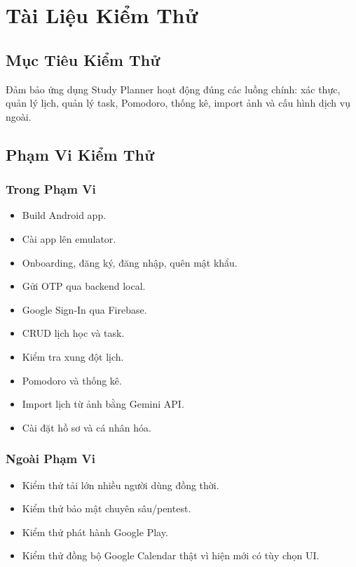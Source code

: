 \documentclass[12pt,a4paper]{report}
\begin{document}
\chapter{Tài Liệu Kiểm Thử}

\section{Mục Tiêu Kiểm Thử}

Đảm bảo ứng dụng Study Planner hoạt động đúng các luồng chính: xác thực, quản lý lịch, quản lý task, Pomodoro, thống kê, import ảnh và cấu hình dịch vụ ngoài.

\section{Phạm Vi Kiểm Thử}

\subsection{Trong Phạm Vi}

\begin{itemize}
\item Build Android app.
\item Cài app lên emulator.
\item Onboarding, đăng ký, đăng nhập, quên mật khẩu.
\item Gửi OTP qua backend local.
\item Google Sign-In qua Firebase.
\item CRUD lịch học và task.
\item Kiểm tra xung đột lịch.
\item Pomodoro và thống kê.
\item Import lịch từ ảnh bằng Gemini API.
\item Cài đặt hồ sơ và cá nhân hóa.
\end{itemize}

\subsection{Ngoài Phạm Vi}

\begin{itemize}
\item Kiểm thử tải lớn nhiều người dùng đồng thời.
\item Kiểm thử bảo mật chuyên sâu/pentest.
\item Kiểm thử phát hành Google Play.
\item Kiểm thử đồng bộ Google Calendar thật vì hiện mới có tùy chọn UI.
\end{itemize}
\end{document}

